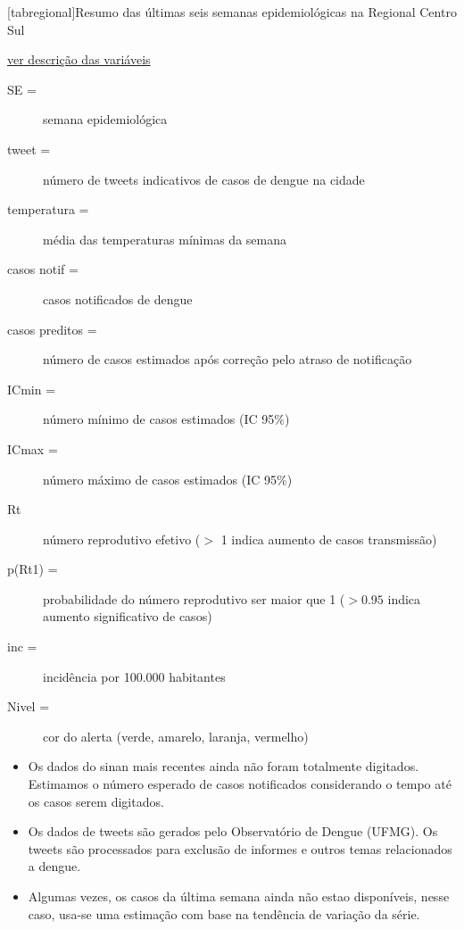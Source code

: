 \documentclass[10pt]{article} %
\begin{document}
[tabregional]{Resumo das últimas seis semanas epidemiológicas na Regional Centro Sul }\begin{center}




\end{center}\small{\hyperlink{vartab}{ver descrição das variáveis}}

\begin{minipage}[t]{1\linewidth} 

\hypertarget{vartab}{}

\begin{description}
\item [SE =] semana epidemiológica
\item [tweet =] número de tweets indicativos de casos de dengue na cidade
\item [temperatura =] média das temperaturas mínimas da semana
\item [casos notif =] casos notificados de dengue 
\item [casos preditos =] número de casos estimados após correção pelo atraso de notificação
\item [ICmin =] número mínimo de casos estimados (IC 95\%)
\item [ICmax =] número máximo de casos estimados (IC 95\%)
\item [Rt] número reprodutivo efetivo ($>$ 1 indica aumento de casos transmissão)
\item [p(Rt1) =] probabilidade do número reprodutivo ser maior que 1 ($>0.95$ indica aumento significativo de casos)
\item [inc =] incidência por 100.000 habitantes
\item [Nivel =] cor do alerta (verde, amarelo, laranja, vermelho)
\end{description}

\hypertarget{notas}{}

\begin{itemize}
\item Os dados do sinan mais recentes ainda não foram totalmente digitados. Estimamos o número esperado de casos notificados considerando o tempo até os casos serem digitados.
\item Os dados de tweets são gerados pelo Observatório de Dengue (UFMG). Os tweets são processados para exclusão de informes e outros temas relacionados a dengue.
\item Algumas vezes, os casos da última semana ainda não estao disponíveis, nesse caso, usa-se uma estimação com base na tendência de variação da série.
\end{itemize}


\end{minipage}
\end{document}
